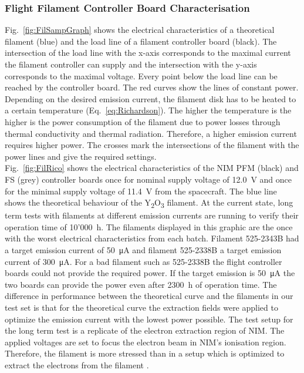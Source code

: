 		
		\subsubsection{Flight Filament Controller Board Characterisation}
		Fig.~\ref{fig:FilSampGraph} shows the electrical characteristics of a theoretical filament (blue) and the load line of a filament controller board (black). The intersection of the load line with the x-axis corresponds to the maximal current the filament controller can supply and the intersection with the y-axis corresponds to the maximal voltage. Every point below the load line can be reached by the controller board. The red curves show the lines of constant power. Depending on the desired emission current, the filament disk has to be heated to a certain temperature (Eq.~\eqref{eq:Richardson}). The higher the temperature is the higher is the power consumption of the filament due to power losses through thermal conductivity and thermal radiation. Therefore, a higher emission current requires higher power. The crosses mark the intersections of the filament with the power lines and give the required settings.\\
		Fig.~\ref{fig:FilRico} shows the electrical characteristics of the NIM PFM (black) and FS (grey) controller boards once for nominal supply voltage of 12.0~V and once for the minimal supply voltage of 11.4~V from the spacecraft. The blue line shows the theoretical behaviour of the Y\textsubscript{2}O\textsubscript{3} filament. At the current state, long term tests with filaments at different emission currents are running to verify their operation time of 10'000~h. The filaments displayed in this graphic are the once with the worst electrical characteristics from each batch. Filament 525-2343B had a target emission current of 50~\si{\micro\ampere} and filament 525-2338B a target emission current of 300~\si{\micro\ampere}. For a bad filament such as 525-2338B the flight controller boards could not provide the required power. If the target emission is 50~\si{\micro\ampere} the two boards can provide the power even after 2300~h of operation time. The difference in performance between the theoretical curve and the filaments in our test set is that for the theoretical curve the extraction fields were applied to optimize the emission current with the lowest power possible. The test setup for the long term test is a replicate of the electron extraction region of NIM. The applied voltages are set to focus the electron beam in NIM's ionisation region. Therefore, the filament is more stressed than in a setup which is optimized to extract the electrons from the filament \cite{Diss_Fausch}.
		


